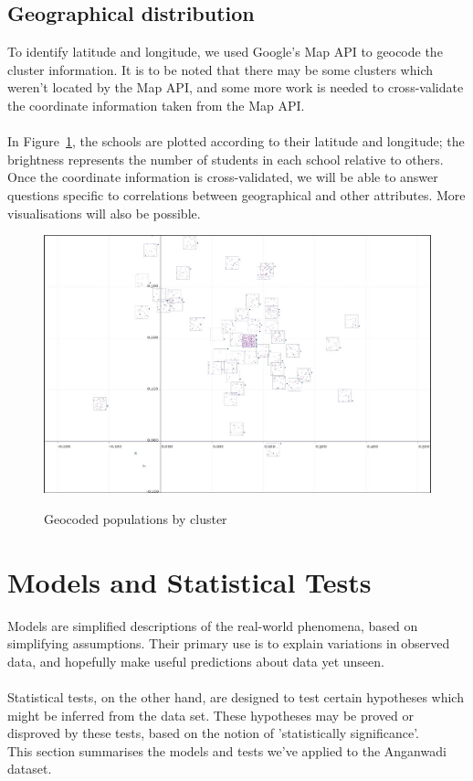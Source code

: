 \documentclass[10pt]{article}
\begin{document}
\subsection{Geographical distribution}
To identify latitude and longitude, we used Google's Map API to geocode the cluster information. It is to be noted that there may be some clusters which weren't located by the Map API, and some more work is needed to cross-validate the coordinate information taken from the Map API.\\\\
In Figure~\ref{GeographicalDistributionOfPopulation}, the schools are plotted according to their latitude and longitude; the brightness represents the number of students in each school relative to others. Once the coordinate information is cross-validated, we will be able to answer questions specific to correlations between geographical and other attributes. More visualisations will also be possible.
\begin{figure}
\caption{Geocoded populations by cluster}
\label{GeographicalDistributionOfPopulation}
\begin{center}
\includegraphics[width=170mm]{ReportMedia/GeographicalDistributionOfPopulation.jpg}\\
\end{center}
\end{figure}
\section{Models and Statistical Tests}
Models are simplified descriptions of the real-world phenomena, based on simplifying assumptions. Their primary use is to explain variations in observed data, and hopefully make useful predictions about data yet unseen.\\\\
Statistical tests, on the other hand, are designed to test certain hypotheses which might be inferred from the data set. These hypotheses may be proved or disproved by these tests, based on the notion of 'statistically significance'.\\ 
This section summarises the models and tests we've applied to the Anganwadi dataset.
\end{document}
